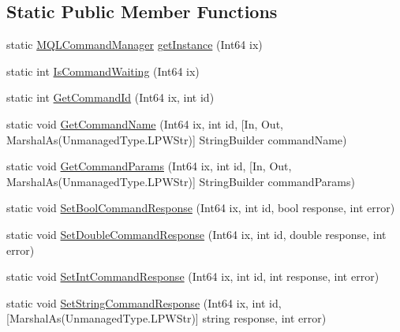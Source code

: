 \subsection*{Static Public Member Functions}
\begin{DoxyCompactItemize}
\item 
static \hyperlink{class_m_q_l4_c_sharp_1_1_base_1_1_m_q_l_1_1_m_q_l_command_manager}{M\+Q\+L\+Command\+Manager} \hyperlink{class_m_q_l4_c_sharp_1_1_base_1_1_m_q_l_1_1_m_q_l_command_manager_aa454d69a382b4d9b692fa059da8ac564}{get\+Instance} (Int64 ix)
\item 
static int \hyperlink{class_m_q_l4_c_sharp_1_1_base_1_1_m_q_l_1_1_m_q_l_command_manager_ae6f9740a6693662e6fb0c8b994dac54b}{Is\+Command\+Waiting} (Int64 ix)
\item 
static int \hyperlink{class_m_q_l4_c_sharp_1_1_base_1_1_m_q_l_1_1_m_q_l_command_manager_a648460691fc7fe8e0860f73e0eac9d0f}{Get\+Command\+Id} (Int64 ix, int id)
\item 
static void \hyperlink{class_m_q_l4_c_sharp_1_1_base_1_1_m_q_l_1_1_m_q_l_command_manager_a9a3a519a087e100859067b57828771b8}{Get\+Command\+Name} (Int64 ix, int id, \mbox{[}In, Out, Marshal\+As(Unmanaged\+Type.\+L\+P\+W\+Str)\mbox{]} String\+Builder command\+Name)
\item 
static void \hyperlink{class_m_q_l4_c_sharp_1_1_base_1_1_m_q_l_1_1_m_q_l_command_manager_a5e2c5fa6ffd6051251a2149f577a2557}{Get\+Command\+Params} (Int64 ix, int id, \mbox{[}In, Out, Marshal\+As(Unmanaged\+Type.\+L\+P\+W\+Str)\mbox{]} String\+Builder command\+Params)
\item 
static void \hyperlink{class_m_q_l4_c_sharp_1_1_base_1_1_m_q_l_1_1_m_q_l_command_manager_a5a566e737547a9532328200e052eac70}{Set\+Bool\+Command\+Response} (Int64 ix, int id, bool response, int error)
\item 
static void \hyperlink{class_m_q_l4_c_sharp_1_1_base_1_1_m_q_l_1_1_m_q_l_command_manager_a2e4c4fb7a8857bec2989f215aebfcee2}{Set\+Double\+Command\+Response} (Int64 ix, int id, double response, int error)
\item 
static void \hyperlink{class_m_q_l4_c_sharp_1_1_base_1_1_m_q_l_1_1_m_q_l_command_manager_a24ab964fef06dfacf50a45569d072371}{Set\+Int\+Command\+Response} (Int64 ix, int id, int response, int error)
\item 
static void \hyperlink{class_m_q_l4_c_sharp_1_1_base_1_1_m_q_l_1_1_m_q_l_command_manager_ad2c1c396dd566f24fca374c8c2f23db6}{Set\+String\+Command\+Response} (Int64 ix, int id, \mbox{[}Marshal\+As(Unmanaged\+Type.\+L\+P\+W\+Str)\mbox{]} string response, int error)

\end{DoxyCompactItemize}
